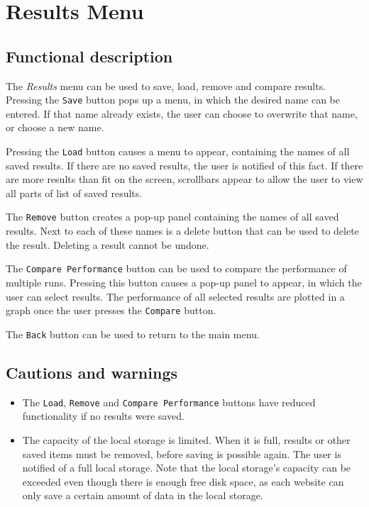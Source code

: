 \section{Results Menu}\label{sec:resultsmenu}
  \subsection*{Functional description}
  The \emph{Results} menu can be used to save, load, remove and compare results. Pressing the \texttt{Save} button pops up a menu, in which the desired name can be entered. If that name already exists, the user can choose to overwrite that name, or choose a new name.
  
  Pressing the \texttt{Load} button causes a menu to appear, containing the names of all saved results. If there are no saved results, the user is notified of this fact. If there are more results than fit on the screen, scrollbars appear to allow the user to view all parts of list of saved results.
  
  The \texttt{Remove} button creates a pop-up panel containing the names of all saved results. Next to each of these names is a delete button that can be used to delete the result. Deleting a result cannot be undone. 
  
  The \texttt{Compare Performance} button can be used to compare the performance of multiple runs. Pressing this button causes a pop-up panel to appear, in which the user can select results. The performance of all selected results are plotted in a graph once the user presses the \texttt{Compare} button.
  
  The \texttt{Back} button can be used to return to the main menu.

  \subsection*{Cautions and warnings}
  \begin{itemize}
    \item The \texttt{Load}, \texttt{Remove} and \texttt{Compare Performance} buttons have reduced functionality if no results were saved.
    \item The capacity of the local storage is limited. When it is full, results or other saved \projectname{} items must be removed, before saving is possible again. The user is notified of a full local storage. Note that the local storage's capacity can be exceeded even though there is enough free disk space, as each website can only save a certain amount of data in the local storage.
  \end{itemize}  

